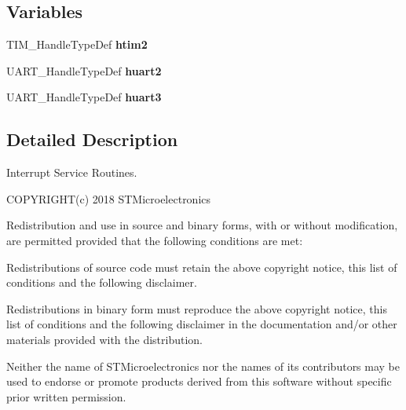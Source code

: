 \subsection*{Variables}
\begin{DoxyCompactItemize}
\item 
T\+I\+M\+\_\+\+Handle\+Type\+Def \textbf{ htim2}
\item 
U\+A\+R\+T\+\_\+\+Handle\+Type\+Def \textbf{ huart2}
\item 
U\+A\+R\+T\+\_\+\+Handle\+Type\+Def \textbf{ huart3}
\end{DoxyCompactItemize}


\subsection{Detailed Description}
Interrupt Service Routines. 

C\+O\+P\+Y\+R\+I\+G\+H\+T(c) 2018 S\+T\+Microelectronics

Redistribution and use in source and binary forms, with or without modification, are permitted provided that the following conditions are met\+:
\begin{DoxyEnumerate}
\item Redistributions of source code must retain the above copyright notice, this list of conditions and the following disclaimer.
\item Redistributions in binary form must reproduce the above copyright notice, this list of conditions and the following disclaimer in the documentation and/or other materials provided with the distribution.
\item Neither the name of S\+T\+Microelectronics nor the names of its contributors may be used to endorse or promote products derived from this software without specific prior written permission.
\end{DoxyEnumerate}


